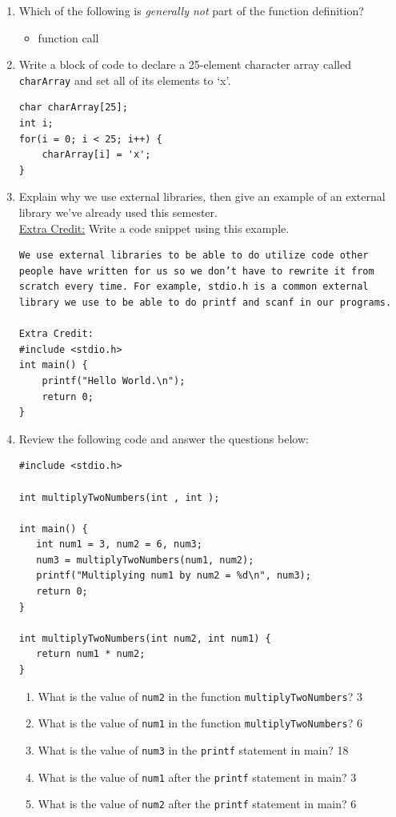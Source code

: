 \documentclass[letter,11pt]{article}
\newcommand*\tick{\item[\Checkmark]}
\begin{document}
\begin{enumerate}
    \item Which of the following is \textit{generally not} part of the function definition?
    \begin{itemize}
        \tick function call
    \end{itemize}
    
    \item Write a block of code to declare a 25-element character array called \texttt{charArray} and set all of its elements to `x'.
    \begin{verbatim}
char charArray[25];
int i;
for(i = 0; i < 25; i++) {
    charArray[i] = 'x';
}
    \end{verbatim}
    
    \newpage
    \item Explain why we use external libraries, then give an example of an external library we've already used this semester. \\
    \underline{Extra Credit:} Write a code snippet using this example.
    \begin{verbatim}
We use external libraries to be able to do utilize code other people have written for us so we don’t have to rewrite it from scratch every time. For example, stdio.h is a common external library we use to be able to do printf and scanf in our programs.

Extra Credit:
#include <stdio.h>
int main() {
    printf("Hello World.\n");
    return 0;
}
    \end{verbatim}
    
    \item Review the following code and answer the questions below:
    \begin{verbatim}
#include <stdio.h>

int multiplyTwoNumbers(int , int );

int main() {
   int num1 = 3, num2 = 6, num3;
   num3 = multiplyTwoNumbers(num1, num2);
   printf("Multiplying num1 by num2 = %d\n", num3);
   return 0;
}

int multiplyTwoNumbers(int num2, int num1) {
   return num1 * num2;
}
    \end{verbatim}
    \begin{enumerate}
        \item What is the value of \texttt{num2} in the function \texttt{multiplyTwoNumbers}? {\color{red}3}
        \item What is the value of \texttt{num1} in the function \texttt{multiplyTwoNumbers}? {\color{red}6}
        \item What is the value of \texttt{num3} in the \texttt{printf} statement in main? {\color{red}18}
        \item What is the value of \texttt{num1} after the \texttt{printf} statement in main? {\color{red}3}
        \item What is the value of \texttt{num2} after the \texttt{printf} statement in main?
        {\color{red}6}
    \end{enumerate}
    

\end{enumerate}
\end{document}
